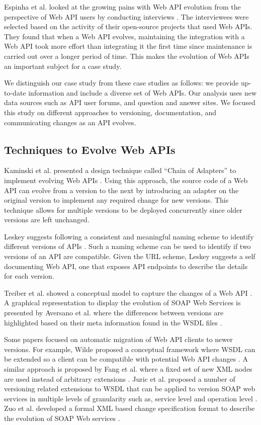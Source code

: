 Espinha et al. looked at the growing pains with Web API evolution from the perspective of Web API users by conducting interviews \cite{espinha}. The interviewees were selected based on the activity of their open-source projects that used Web APIs. They found that when a Web API evolves, maintaining the integration with a Web API took more effort than integrating it the first time since maintenance is carried out over a longer period of time. This makes the evolution of Web APIs an important subject for a case study.

We distinguish our case study from these case studies as follows: we provide up-to-date information and include a diverse set of Web APIs. Our analysis uses new data sources such as API user forums, and question and answer sites. We focused this study on different approaches to versioning, documentation, and communicating changes as an API evolves.

\subsection{Techniques to Evolve Web APIs} %
\label{sub:techniques}
Kaminski et al. presented a design technique called ``Chain of Adapters'' to implement evolving Web APIs \cite{kaminski2006design}. Using this approach, the source code of a Web API can evolve from a version to the next by introducing an adapter on the original version to implement any required change for new versions. This technique allows for multiple versions to be deployed concurrently since older versions are left unchanged.

Leskey suggests following a consistent and meaningful naming scheme to identify different versions of APIs \cite{laskey2008considerations}. Such a naming scheme can be used to identify if two versions of an API are compatible. Given the URL scheme, Leskey suggests a self documenting Web API, one that exposes API endpoints to describe the details for each version.

Treiber et al. showed a conceptual model to capture the changes of a Web API \cite{treiber2009analyzing}. A graphical representation to display the evolution of SOAP Web Services is presented by Aversano et al. where the differences between versions are highlighted based on their meta information found in the WSDL files \cite{aversano2005visualizing}.

Some papers focused on automatic migration of Web API clients to newer versions. For example, Wilde proposed a conceptual framework where WSDL can be extended so a client can be compatible with potential Web API changes \cite{wilde2004semantically}. A similar approach is proposed by Fang et al. where a fixed set of new XML nodes are used instead of arbitrary extensions \cite{fang2007version}. Juric et al. proposed a number of versioning related extensions to WSDL that can be applied to version SOAP web services in multiple levels of granularity such as, service level and operation level \cite{Juric20091326}. Zuo et al. developed a formal XML based change specification format to describe the evolution of SOAP Web services \cite{zuo6928972}.

